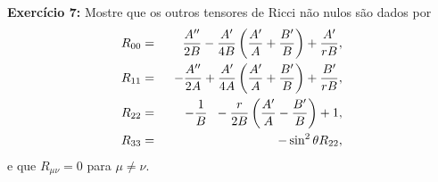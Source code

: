 \documentclass[12pt,a4paper,titlepage,brazil]{article}
\begin{document}
\begin{tcolorbox}
  {\bf Exercício 7:} Mostre que os outros tensores de Ricci não nulos são dados por
\begin{eqnarray}
  \label{eq:R00} R_{0 0} & = & \frac{A''}{2 B} -
  \frac{A'}{4 B} \left( \frac{A'}{A} +
  \frac{B'}{B}\right) + \frac{A'}{r B} , \\
  \label{eq:R11} R_{1 1} & = & \hspace{0.2cm} - \frac{A''}{2 A}
  + \frac{A'}{4 A} \left( \frac{A'}{A} +
  \frac{B'}{B}\right) + \frac{B'}{r B} ,\\
  \label{eq:R22} R_{2 2} & = & \hspace{0.3cm} - \frac{1}{B} \hspace{0.2cm} -
  \frac{r}{2 B} \left( \frac{A'}{A} -
  \frac{B'}{B} \right) + 1 , \\
  \label{eq:VR22}R_{3 3} & = & \hspace{0.2cm} - \sin^{2} \theta R_{2 2},
\end{eqnarray}
e que $R_{\mu \nu} = 0$ para $\mu \neq \nu$.
\end{tcolorbox}
\end{document}
